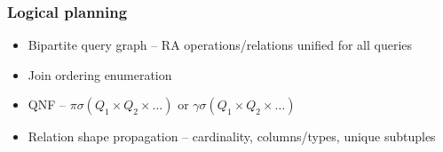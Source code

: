 \begin{frame}
  \frametitle{Logical planning}
  \begin{itemize}
  \item Bipartite query graph -- RA operations/relations unified for all queries
  \item Join ordering enumeration
  \item QNF -- \(\pi \sigma (Q_1 \times Q_2 \times \dots )\) or
    \(\gamma \sigma (Q_1 \times Q_2 \times \dots )\)
  \item Relation shape propagation -- cardinality, columns/types, unique subtuples
  \end{itemize}

\end{frame}

